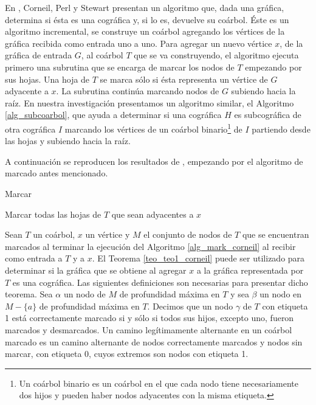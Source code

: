En \cite{Corneil02}, Corneil, Perl y Stewart presentan un algoritmo
que, dada una gráfica, determina si ésta es una cográfica y, si lo
es, devuelve su coárbol. Éste es un algoritmo incremental, se
construye un coárbol agregando los vértices de la gráfica recibida
como entrada uno a uno. Para agregar un nuevo vértice $x$, de la
gráfica de entrada $G$, al coárbol $T$ que se va construyendo, el
algoritmo ejecuta primero una subrutina que se encarga de marcar los
nodos de $T$ empezando por sus hojas. Una hoja de $T$ se marca sólo
si ésta representa un vértice de $G$ adyacente a $x$. La subrutina
continúa marcando nodos de $G$ subiendo hacia la raíz. En nuestra
investigación presentamos un algoritmo similar, el Algoritmo
\ref{alg_subcoarbol}, que ayuda a determinar si una cográfica
$H$ es subcográfica de otra cográfica $I$ marcando los vértices de
un coárbol binario\footnote{Un coárbol binario es un coárbol en el
que cada nodo tiene necesariamente dos hijos y pueden haber nodos
adyacentes con la misma etiqueta.} de $I$ partiendo desde las hojas
y subiendo hacia la raíz.

A continuación se reproducen los resultados de \cite{ Corneil02},
empezando por el algoritmo de marcado antes mencionado.

\begin{algorithm}[!htbp]
\caption{Marcar}
\label{alg_mark_corneil}
\DontPrintSemicolon %
Marcar todas las hojas de $T$ que sean adyacentes a $x$\;


\end{algorithm}

Sean $T$ un coárbol, $x$ un vértice y $M$ el conjunto de nodos
de $T$ que se encuentran marcados al terminar la ejecución del
Algoritmo \ref{alg_mark_corneil} al recibir como entrada a $T$
y a $x$. El Teorema \ref{teo_teo1_corneil} puede ser utilizado
para determinar si la gráfica que se obtiene al agregar $x$ a
la gráfica representada por $T$ es una cográfica.
Las siguientes definiciones son necesarias para presentar dicho
teorema. Sea $\alpha$ un nodo de $M$ de profundidad máxima en $T$
y sea $\beta$ un nodo en $M-\{a\}$ de profundidad máxima en $T$.
Decimos que un nodo $\gamma$ de $T$ con etiqueta 1 está
correctamente marcado si y sólo si todos sus hijos, excepto uno,
fueron marcados y desmarcados. Un camino legítimamente alternante
en un coárbol marcado es un camino alternante de nodos correctamente
marcados y nodos sin marcar, con etiqueta 0, cuyos extremos son nodos
con etiqueta 1.


